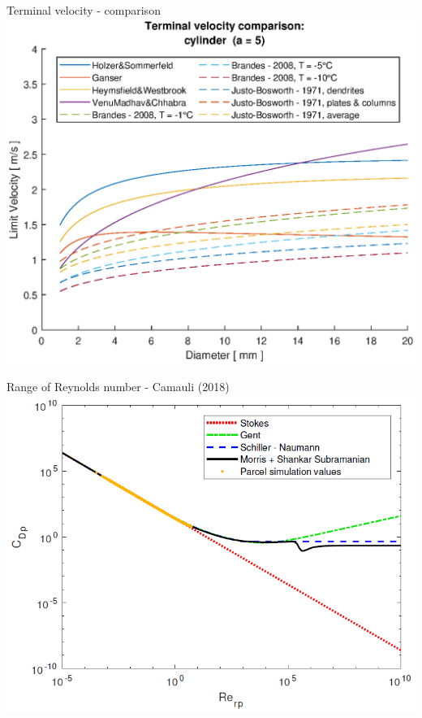 \documentclass[11pt]{beamer}
\begin{document}
	\begin{frame}{Terminal velocity - comparison}
		\centering
		\includegraphics[height=\textheight,width=\textwidth,keepaspectratio] {vt_cylinder5.eps}		
	\end{frame}

	\begin{frame}{Range of Reynolds number - Camauli (2018)}
		\centering
		\includegraphics[height=\textheight,width=\textwidth,keepaspectratio] {Camauli.png}		
	\end{frame}
\end{document}
